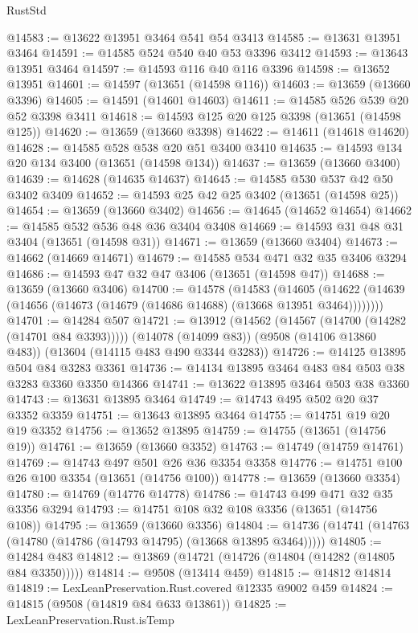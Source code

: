\begin{lexlean}{RustStd}
\begin{coremodule}
@14583 := @13622 @13951 @3464 @541 @54 @3413
@14585 := @13631 @13951 @3464
@14591 := @14585 @524 @540 @40 @53 @3396 @3412
@14593 := @13643 @13951 @3464
@14597 := @14593 @116 @40 @116 @3396
@14598 := @13652 @13951
@14601 := @14597 (@13651 (@14598 @116))
@14603 := @13659 (@13660 @3396)
@14605 := @14591 (@14601 @14603)
@14611 := @14585 @526 @539 @20 @52 @3398 @3411
@14618 := @14593 @125 @20 @125 @3398 (@13651 (@14598 @125))
@14620 := @13659 (@13660 @3398)
@14622 := @14611 (@14618 @14620)
@14628 := @14585 @528 @538 @20 @51 @3400 @3410
@14635 := @14593 @134 @20 @134 @3400 (@13651 (@14598 @134))
@14637 := @13659 (@13660 @3400)
@14639 := @14628 (@14635 @14637)
@14645 := @14585 @530 @537 @42 @50 @3402 @3409
@14652 := @14593 @25 @42 @25 @3402 (@13651 (@14598 @25))
@14654 := @13659 (@13660 @3402)
@14656 := @14645 (@14652 @14654)
@14662 := @14585 @532 @536 @48 @36 @3404 @3408
@14669 := @14593 @31 @48 @31 @3404 (@13651 (@14598 @31))
@14671 := @13659 (@13660 @3404)
@14673 := @14662 (@14669 @14671)
@14679 := @14585 @534 @471 @32 @35 @3406 @3294
@14686 := @14593 @47 @32 @47 @3406 (@13651 (@14598 @47))
@14688 := @13659 (@13660 @3406)
@14700 := @14578
    (@14583
      (@14605 (@14622 (@14639 (@14656 (@14673 (@14679 (@14686 @14688) (@13668 @13951 @3464))))))))
@14701 := @14284 @507
@14721 := @13912
    (@14562 (@14567 (@14700 (@14282 (@14701 @84 @3393)))))
    (@14078 (@14099 @83))
    (@9508 (@14106 @13860 @483))
    (@13604 (@14115 @483 @490 @3344 @3283))
@14726 := @14125 @13895 @504 @84 @3283 @3361
@14736 := @14134 @13895 @3464 @483 @84 @503 @38 @3283 @3360 @3350 @14366
@14741 := @13622 @13895 @3464 @503 @38 @3360
@14743 := @13631 @13895 @3464
@14749 := @14743 @495 @502 @20 @37 @3352 @3359
@14751 := @13643 @13895 @3464
@14755 := @14751 @19 @20 @19 @3352
@14756 := @13652 @13895
@14759 := @14755 (@13651 (@14756 @19))
@14761 := @13659 (@13660 @3352)
@14763 := @14749 (@14759 @14761)
@14769 := @14743 @497 @501 @26 @36 @3354 @3358
@14776 := @14751 @100 @26 @100 @3354 (@13651 (@14756 @100))
@14778 := @13659 (@13660 @3354)
@14780 := @14769 (@14776 @14778)
@14786 := @14743 @499 @471 @32 @35 @3356 @3294
@14793 := @14751 @108 @32 @108 @3356 (@13651 (@14756 @108))
@14795 := @13659 (@13660 @3356)
@14804 := @14736 (@14741 (@14763 (@14780 (@14786 (@14793 @14795) (@13668 @13895 @3464)))))
@14805 := @14284 @483
@14812 := @13869 (@14721 (@14726 (@14804 (@14282 (@14805 @84 @3350)))))
@14814 := @9508 (@13414 @459)
@14815 := @14812 @14814
@14819 := LexLeanPreservation.Rust.covered @12335 @9002 @459
@14824 := @14815 (@9508 (@14819 @84 @633 @13861))
@14825 := LexLeanPreservation.Rust.isTemp

\end{coremodule}
\end{lexlean}
